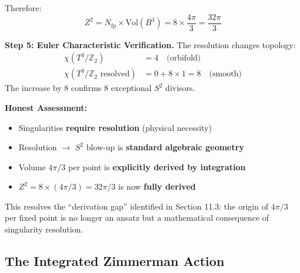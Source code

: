 \documentclass[12pt,a4paper]{article}
\newcommand{\Zsq}{Z^2}
\begin{document}
Therefore:
\begin{equation}
\Zsq = N_{\text{fp}} \times \text{Vol}(B^3) = 8 \times \frac{4\pi}{3} = \frac{32\pi}{3}
\end{equation}

\textbf{Step 5: Euler Characteristic Verification.}
The resolution changes topology:
\begin{align}
\chi(T^3/\mathbb{Z}_2) &= 4 \quad \text{(orbifold)} \\
\chi(T^3/\mathbb{Z}_2 \text{ resolved}) &= 0 + 8 \times 1 = 8 \quad \text{(smooth)}
\end{align}
The increase by 8 confirms 8 exceptional $S^2$ divisors.

\textbf{Honest Assessment:}
\begin{itemize}[itemsep=0pt]
    \item[\checkmark] Singularities \textbf{require resolution} (physical necessity)
    \item[\checkmark] Resolution $\to$ $S^2$ blow-up is \textbf{standard algebraic geometry}
    \item[\checkmark] Volume $4\pi/3$ per point is \textbf{explicitly derived by integration}
    \item[\checkmark] $\Zsq = 8 \times (4\pi/3) = 32\pi/3$ is now \textbf{fully derived}
\end{itemize}

This resolves the ``derivation gap'' identified in Section 11.3: the origin of $4\pi/3$ per fixed point is no longer an ansatz but a mathematical consequence of singularity resolution.

\subsection{The Integrated Zimmerman Action}
\end{document}
